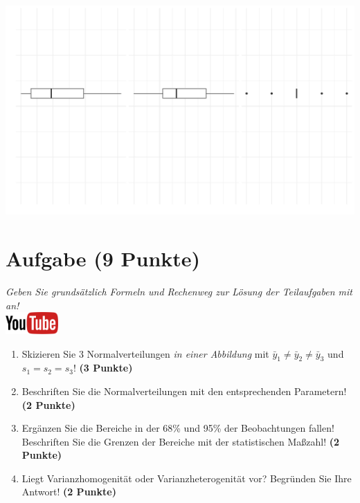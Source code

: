 \documentclass[a4paper, 9pt]{scrartcl}\usepackage[]{graphicx}\usepackage[]{xcolor}
\makeatletter
\def\maxwidth{ %
  \ifdim\Gin@nat@width>\linewidth
    \linewidth
  \else
    \Gin@nat@width
  \fi
}
\makeatother
\begin{document}
{\centering \includegraphics[width=\maxwidth]{img/desc-stat-11-1} 

}




 
\clearpage

\section{Aufgabe \hfill (9 Punkte)}

\textit{Geben Sie grunds{\"a}tzlich Formeln und Rechenweg zur L{\"o}sung der
  Teilaufgaben mit an!} \\[1Ex]

\hfill\href{https://youtu.be/ZrJhn2wPbq4}{\includegraphics[width =
  2cm]{img/youtube}}\\[1Ex]



\begin{enumerate}
\item Skizieren Sie $3$ Normalverteilungen \textit{in einer
    Abbildung} mit $\bar{y}_1 \neq \bar{y}_2 \neq \bar{y}_3$ und $s_1 = s_2 = s_3$! \textbf{(3 Punkte)}
\item Beschriften Sie die Normalverteilungen mit den entsprechenden
  Parametern! \textbf{(2 Punkte)}
\item Erg{\"a}nzen Sie die Bereiche in der 68\% und 95\% der Beobachtungen
  fallen! Beschriften Sie die Grenzen der Bereiche mit der statistischen Ma{\ss}zahl! \textbf{(2 Punkte)}
\item Liegt Varianzhomogenit{\"a}t oder Varianzheterogenit{\"a}t vor? Begr{\"u}nden Sie
  Ihre Antwort! \textbf{(2 Punkte)}
\end{enumerate}
\end{document}
